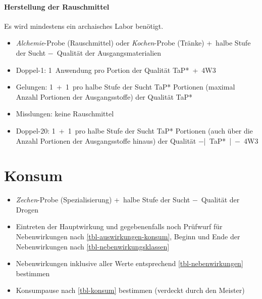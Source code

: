 \begin{multicols}{2}
\paragraph*{Herstellung der Rauschmittel}
Es wird mindestens ein archaisches Labor benötigt.
\begin{itemize}[nosep]
	\item \emph{Alchemie}-Probe (Rauschmittel) oder \emph{Kochen}-Probe (Tränke) +~halbe Stufe der Sucht −~Qualität der Ausgangsmaterialien
	\item Doppel-1: 1~Anwendung pro Portion der Qualität TaP*~+~4W3
	\item Gelungen: 1~+~1~pro halbe Stufe der Sucht TaP* Portionen (maximal Anzahl Portionen der Ausgangsstoffe)	der Qualität TaP*
	\item Misslungen: keine Rauschmittel
	\item Doppel-20: 1~+~1~pro halbe Stufe der Sucht TaP* Portionen (auch über die Anzahl Portionen der Ausgangsstoffe hinaus) der Qualität −|~TaP*~|~−~4W3 
\end{itemize}

\section*{Konsum}
\begin{itemize}[nosep]
	\item \emph{Zechen}-Probe (Spezialisierung) +~halbe Stufe der Sucht −~Qualität der Drogen
	\item Eintreten der Hauptwirkung und gegebenenfalls noch Prüfwurf für Nebenwirkungen nach \vref{tbl-auswirkungen-konsum}, Beginn und Ende der Nebenwirkungen nach \vref{tbl-nebenwirkungsklassen}
	\item Nebenwirkungen inklusive aller Werte entsprechend \vref{tbl-nebenwirkungen} bestimmen
	\item Konsumpause nach \vref{tbl-konsum} bestimmen (verdeckt durch den Meister)
\end{itemize}
\end{multicols}



